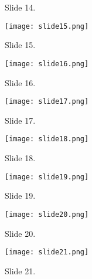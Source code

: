 \documentclass[write-up.tex]{subfiles}
\begin{document}
\begin{appendices}
\begin{figure}[h]
\caption{Slide 14.}
\end{figure}
\begin{figure}[h]
\centering
\texttt{[image: slide15.png]}
\caption{Slide 15.}
\end{figure}
\begin{figure}[h]
\centering
\texttt{[image: slide16.png]}
\caption{Slide 16.}
\end{figure}
\begin{figure}[h]
\centering
\texttt{[image: slide17.png]}
\caption{Slide 17.}
\end{figure}
\begin{figure}[h]
\centering
\texttt{[image: slide18.png]}
\caption{Slide 18.}
\end{figure}
\begin{figure}[h]
\centering
\texttt{[image: slide19.png]}
\caption{Slide 19.}
\end{figure}
\begin{figure}[h]
\centering
\texttt{[image: slide20.png]}
\caption{Slide 20.}
\end{figure}
\begin{figure}[h]
\centering
\texttt{[image: slide21.png]}
\caption{Slide 21.}
\end{figure}
\end{appendices}
\end{document}
